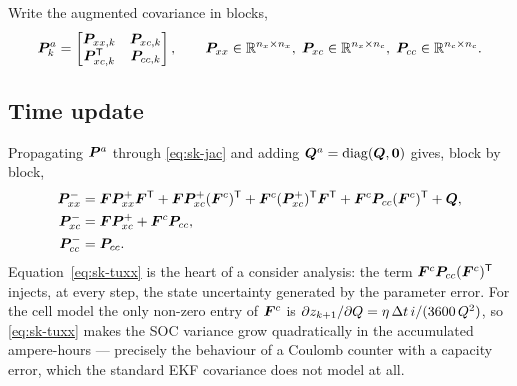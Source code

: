 Write the augmented covariance in blocks,
\begin{equation}
\bm{P}^a_k = \begin{bmatrix} \bm{P}_{xx,k} & \bm{P}_{xc,k}\\ \bm{P}_{xc,k}^{\mathsf{T}} & \bm{P}_{cc,k}\end{bmatrix},
\qquad \bm{P}_{xx}\in\mathbb{R}^{n_x\times n_x},\;\bm{P}_{xc}\in\mathbb{R}^{n_x\times n_c},\;
\bm{P}_{cc}\in\mathbb{R}^{n_c\times n_c}.
\label{eq:sk-blocks}
\end{equation}

\subsection{Time update}
Propagating $\bm{P}^a$ through \eqref{eq:sk-jac} and adding
$\bm{Q}^a=\operatorname{diag}(\bm{Q},\bm 0)$ gives, block by block,
\begin{align}
\bm{P}^-_{xx} &= \bm{F}\bm{P}^+_{xx}\bm{F}^{\mathsf{T}} + \bm{F}\bm{P}^+_{xc}(\bm{F}^{c})^{\mathsf{T}} + \bm{F}^{c}(\bm{P}^+_{xc})^{\mathsf{T}}\bm{F}^{\mathsf{T}}
              + \bm{F}^{c}\bm{P}_{cc}(\bm{F}^{c})^{\mathsf{T}} + \bm{Q}, \label{eq:sk-tuxx}\\
\bm{P}^-_{xc} &= \bm{F}\bm{P}^+_{xc} + \bm{F}^{c}\bm{P}_{cc}, \label{eq:sk-tuxc}\\
\bm{P}^-_{cc} &= \bm{P}_{cc}. \label{eq:sk-tucc}
\end{align}
Equation~\eqref{eq:sk-tuxx} is the heart of a consider analysis: the term
$\bm{F}^{c}\bm{P}_{cc}(\bm{F}^{c})^{\mathsf{T}}$ injects, at every step, the state uncertainty generated by the
parameter error.  For the cell model the only non-zero entry of $\bm{F}^c$ is
$\partial z_{k+1}/\partial Q = \eta\,\Delta t\, i/(3600\,Q^2)$, so
\eqref{eq:sk-tuxx} makes the SOC variance grow quadratically in the accumulated
ampere-hours --- precisely the behaviour of a Coulomb counter with a capacity error, which the
standard EKF covariance does not model at all.


